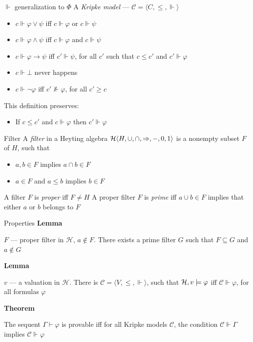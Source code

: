 \documentclass[sans]{beamer}
\begin{document}
\begin{frame}{$\Vdash$ generalization to $\Phi$}
  A \emph{Kripke model} --- $\mathcal{C} = \langle C,\leq,{\Vdash} \rangle$
  \begin{itemize}
    \item $c \Vdash \varphi \vee \psi$ iff $c \Vdash \varphi$ or $c \Vdash \psi$
    \item $c \Vdash \varphi \wedge \psi$ iff $c \Vdash \varphi$ and $c \Vdash \psi$
    \item $c \Vdash \varphi \to \psi$ iff $c' \Vdash \psi$, for all $c'$ such that $c \leq c'$ and $c' \Vdash \varphi$
    \item $c \Vdash \bot$ never happens

    \vfill
    \pause
    \item $c \Vdash \lnot \varphi$ iff $c' \nVdash \varphi$, for all $c' \geq c$
  \end{itemize}

  \pause
  \vfill
  This definition preserves:
  \begin{itemize}
      \item If $c \leq c'$ and $c \Vdash \varphi$ then $c' \Vdash \varphi$
  \end{itemize}
\end{frame}

\begin{frame}{Filter}
  A \emph{filter} in a Heyting algebra $\mathcal{H} \langle H, \cup, \cap, \Rightarrow, -, 0, 1\rangle$ is a nonempty subset $F$ of $H$, such that
  \begin{itemize}
    \item $a, b \in F$ implies $a \cap b \in F$
    \item $a \in F$ and $a \leq b$ implies $b \in F$
  \end{itemize}

  \vfill
  A filter $F$ is \emph{proper} iff $F \neq H$
  \vfill
  A proper filter $F$ is \emph{prime} iff $a \cup b \in F$ implies that either $a$ or $b$ belongs to $F$
\end{frame}

\begin{frame}{Properties}
  \textbf{Lemma}

  $F$ --- proper filter in $\mathcal{H}$, $a \notin F$. There exists a prime filter $G$ such that $F \subseteq G$ and $a \notin G$
  \vfill

  \pause
  \textbf{Lemma}

  $v$ --- a valuation in $\mathcal{H}$. There is $\mathcal{C} = \langle V, \leq, \Vdash \rangle$,
  such that $\mathcal{H}, v \models \varphi$ iff $\mathcal{C} \Vdash \varphi$, for all formulas $\varphi$
  
  \vfill

  \pause
  \textbf{Theorem}

  The sequent $\Gamma \vdash \varphi$ is provable iff for all Kripke models $\mathcal{C}$, the condition
  $\mathcal{C} \Vdash \Gamma$ implies $\mathcal{C} \Vdash \varphi$

\end{frame}
\end{document}
